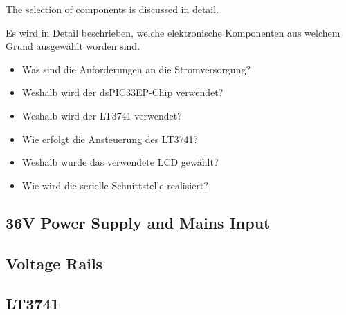 The selection of components is discussed in detail.

Es wird  in  Detail  beschrieben,  welche  elektronische Komponenten aus welchem
Grund ausgew\"ahlt worden sind.

\begin{itemize}
    \item
        Was sind die Anforderungen an die Stromversorgung?
    \item
        Weshalb wird der dsPIC33EP-Chip verwendet?
    \item
        Weshalb wird der LT3741 verwendet?
    \item
        Wie erfolgt die Ansteuerung des LT3741?
    \item
        Weshalb wurde das verwendete LCD gew\"ahlt?
    \item
        Wie wird die serielle Schnittstelle realisiert?
\end{itemize}

\subsection{36V Power Supply and Mains Input}



\subsection{Voltage Rails}



\subsection{LT3741}




%

